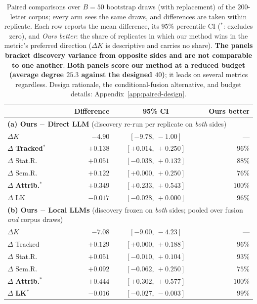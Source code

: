 \begin{table}[t]
\centering
\small
\begin{tabular}{l r c r}
\toprule
& Difference & 95\% CI & Ours better \\
\midrule
\multicolumn{4}{l}{\textbf{(a) Ours $-$ Direct LLM} \; (discovery re-run per replicate on \emph{both} sides)} \\
\midrule
$\Delta K$ & $-4.90$ & $[-9.78,\ -1.00]$ & --- \\
$\Delta$ \textbf{Tracked}$^{*}$ & $+0.138$ & $[+0.014,\ +0.250]$ & $96\%$ \\
$\Delta$ Stat.R. & $+0.051$ & $[-0.038,\ +0.132]$ & $88\%$ \\
$\Delta$ Sem.R. & $+0.122$ & $[+0.000,\ +0.250]$ & $76\%$ \\
$\Delta$ \textbf{Attrib.}$^{*}$ & $+0.349$ & $[+0.233,\ +0.543]$ & $100\%$ \\
$\Delta$ LK & $-0.017$ & $[-0.028,\ +0.000]$ & $96\%$ \\
\midrule
\multicolumn{4}{l}{\textbf{(b) Ours $-$ Local LLMs} \; (discovery frozen on \emph{both} sides; pooled over fusion \emph{and} corpus draws)} \\
\midrule
$\Delta K$ & $-7.08$ & $[-9.00,\ -4.23]$ & --- \\
$\Delta$ Tracked & $+0.129$ & $[+0.000,\ +0.188]$ & $96\%$ \\
$\Delta$ Stat.R. & $+0.051$ & $[-0.010,\ +0.104]$ & $93\%$ \\
$\Delta$ Sem.R. & $+0.092$ & $[-0.062,\ +0.250]$ & $75\%$ \\
$\Delta$ \textbf{Attrib.}$^{*}$ & $+0.444$ & $[+0.302,\ +0.577]$ & $100\%$ \\
$\Delta$ \textbf{LK}$^{*}$ & $-0.016$ & $[-0.027,\ -0.003]$ & $99\%$ \\
\bottomrule
\end{tabular}
\caption{Paired comparisons over $B=50$ bootstrap draws (with replacement) of the $200$-letter corpus; every arm sees the same draws, and differences are taken within replicate. Each row reports the mean difference, its $95\%$ percentile CI ($^{*}$: excludes zero), and \emph{Ours better}: the share of replicates in which our method wins in the metric's preferred direction ($\Delta K$ is descriptive and carries no share). \textbf{The panels bracket discovery variance from opposite sides and are not comparable to one another}. \textbf{Both panels score our method at a reduced budget (average degree $25.3$ against the designed $40$)}; it leads on several metrics regardless. Design rationale, the conditional-fusion alternative, and budget details: Appendix~\ref{app:paired-design}.}
\label{tab:paired}
\end{table}
